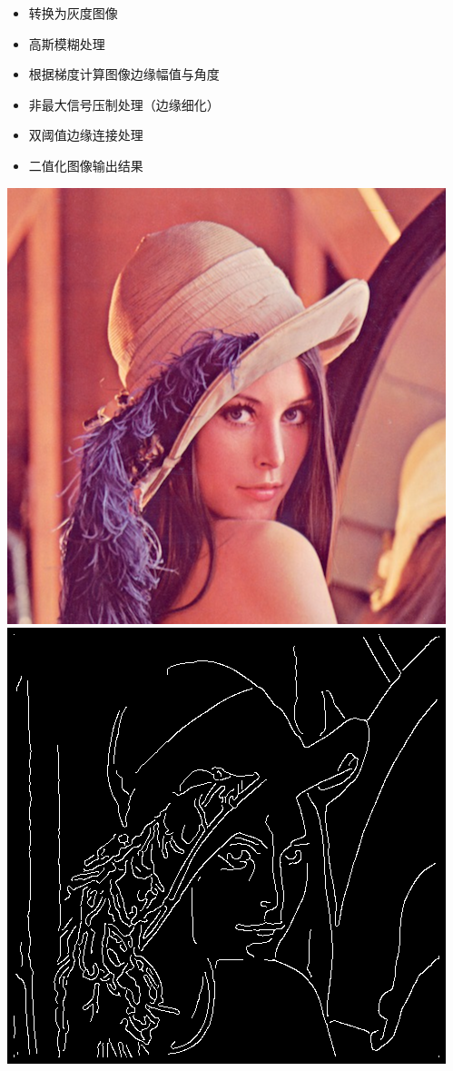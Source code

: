\begin{multicols}{2}
\begin{itemize}
\item[1.]转换为灰度图像
\item[2.]高斯模糊处理
\item[3.]根据梯度计算图像边缘幅值与角度
\item[4.]非最大信号压制处理（边缘细化）
\item[5.]双阈值边缘连接处理
\item[6.]二值化图像输出结果
\end{itemize}
\includegraphics[width=.12\figwidth]{images/Lenna.png}
\includegraphics[width=.12\figwidth]{images/Lenna_out.png}
\end{multicols}

